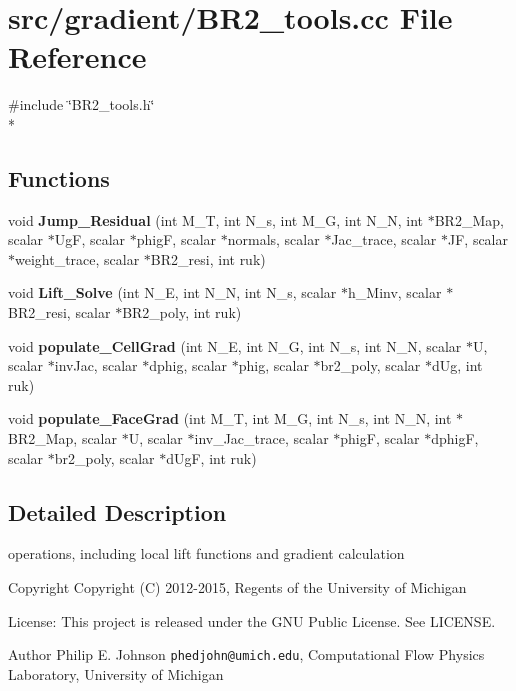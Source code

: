 \section{src/gradient/\-B\-R2\-\_\-tools.cc File Reference}
\label{BR2__tools_8cc}
{\ttfamily \#include \char`\"{}B\-R2\-\_\-tools.\-h\char`\"{}}\\*
\subsection*{Functions}
\begin{DoxyCompactItemize}
\item 
void {\bf Jump\-\_\-\-Residual} (int M\-\_\-\-T, int N\-\_\-s, int M\-\_\-\-G, int N\-\_\-\-N, int $\ast$B\-R2\-\_\-\-Map, scalar $\ast$Ug\-F, scalar $\ast$phig\-F, scalar $\ast$normals, scalar $\ast$Jac\-\_\-trace, scalar $\ast$J\-F, scalar $\ast$weight\-\_\-trace, scalar $\ast$B\-R2\-\_\-resi, int ruk)
\item 
void {\bf Lift\-\_\-\-Solve} (int N\-\_\-\-E, int N\-\_\-\-N, int N\-\_\-s, scalar $\ast$h\-\_\-\-Minv, scalar $\ast$B\-R2\-\_\-resi, scalar $\ast$B\-R2\-\_\-poly, int ruk)
\item 
void {\bf populate\-\_\-\-Cell\-Grad} (int N\-\_\-\-E, int N\-\_\-\-G, int N\-\_\-s, int N\-\_\-\-N, scalar $\ast$U, scalar $\ast$inv\-Jac, scalar $\ast$dphig, scalar $\ast$phig, scalar $\ast$br2\-\_\-poly, scalar $\ast$d\-Ug, int ruk)
\item 
void {\bf populate\-\_\-\-Face\-Grad} (int M\-\_\-\-T, int M\-\_\-\-G, int N\-\_\-s, int N\-\_\-\-N, int $\ast$B\-R2\-\_\-\-Map, scalar $\ast$U, scalar $\ast$inv\-\_\-\-Jac\-\_\-trace, scalar $\ast$phig\-F, scalar $\ast$dphig\-F, scalar $\ast$br2\-\_\-poly, scalar $\ast$d\-Ug\-F, int ruk)
\end{DoxyCompactItemize}


\subsection{Detailed Description}
operations, including local lift functions and gradient calculation \begin{DoxyCopyright}{Copyright}
Copyright (C) 2012-\/2015, Regents of the University of Michigan 
\end{DoxyCopyright}
\begin{DoxyParagraph}{License\-:}
This project is released under the G\-N\-U Public License. See L\-I\-C\-E\-N\-S\-E. 
\end{DoxyParagraph}
\begin{DoxyAuthor}{Author}
Philip E. Johnson {\tt phedjohn@umich.\-edu}, Computational Flow Physics Laboratory, University of Michigan 
\end{DoxyAuthor}


